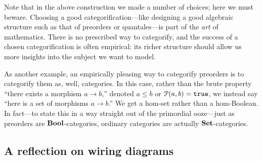 \documentclass[7Sketches]{subfiles}
\begin{document}
Note that in the above construction we made a number of choices; here we must
beware. Choosing a good categorification---like designing a good algebraic
structure such as that of preorders or quantales---is part of the \emph{art} of
mathematics.  There is no prescribed way to categorify, and the success of a
chosen categorification is often empirical: its richer structure should allow us more
insights into the subject we want to model.

As another example, an empirically pleasing way to categorify preorders is to
categorify them as, well, categories.  In this case, rather than the brute
property ``there exists a morphism $a\to b$,'' denoted $a\leq b$ or
$\mathcal{P}(a,b)=\mathtt{true}$, we instead say ``here is a set of morphisms $a\to b$.'' We
get a hom-set rather than a hom-Boolean. In fact---to state this in a way
straight out of the primordial ooze---just as preorders are $\mathbf{Bool}$-categories,
ordinary categories are actually $\mathbf{Set}$-categories.
%

%

\subsection{A reflection on wiring diagrams}%
\label{subsec.reflection_wds}%
\end{document}
